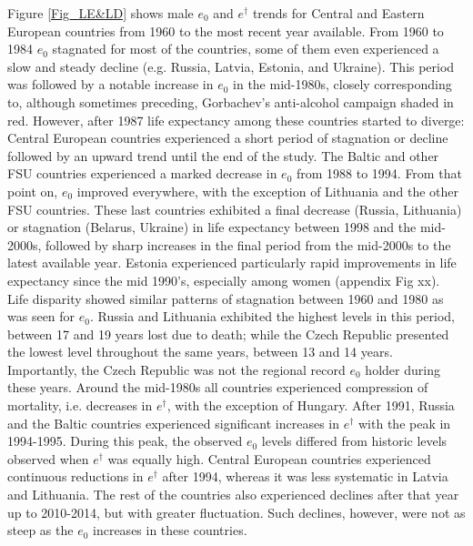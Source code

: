 \documentclass{article}
\begin{document}
\begin{spacing}{1.5}
Figure \ref{Fig_LE&LD} shows male $e_0$ and $e^{\dagger}$ trends for Central and Eastern European countries from 1960 to the most recent year available. From 1960 to 1984 $e_0$ stagnated for most of the countries, some of them even experienced a slow and steady decline (e.g. Russia, Latvia, Estonia, and Ukraine). This period was followed by a notable increase in $e_0$ in the mid-1980s, closely corresponding to, although sometimes preceding, Gorbachev's anti-alcohol campaign shaded in red. However, after 1987 life expectancy among these countries started to diverge: Central European countries experienced a short period of stagnation or decline followed by an upward trend until the end of the study. \textcolor[rgb]{1,0,0}{The Baltic and other FSU countries experienced a marked decrease in $e_0$ from 1988 to 1994. From that point on, $e_0$ improved everywhere, with the exception of Lithuania and the other FSU countries. These last countries exhibited a final decrease (Russia, Lithuania)} or stagnation (Belarus, Ukraine) in life expectancy between 1998 and the mid-2000s, followed by sharp increases in the final period from the mid-2000s to the latest available year. \textcolor[rgb]{1,0,0}{Estonia experienced particularly rapid improvements in life expectancy since the mid 1990's, especially among women (appendix Fig xx)}. \\

Life disparity showed similar patterns of stagnation between 1960 and 1980 as was seen for $e_0$. Russia and Lithuania exhibited the highest levels in this period, between 17 and 19 years lost due to death; while the Czech Republic presented the lowest level throughout the same years, between 13 and 14 years. Importantly, the Czech Republic was not the regional record $e_0$ holder during these years. Around the mid-1980s all countries experienced compression of mortality, i.e. decreases in $e^{\dagger}$, with the exception of Hungary. After 1991, Russia and \textcolor[rgb]{1,0,0}{the Baltic countries} experienced significant increases in $e^{\dagger}$ with the peak in 1994-1995. During this peak, the observed $e_0$ levels differed from historic levels observed when $e^{\dagger}$ was equally high. Central European countries experienced continuous reductions in $e^{\dagger}$ after 1994, whereas it was less systematic in Latvia and Lithuania. The rest of the countries also experienced declines after that year up to 2010-2014, but with greater fluctuation. Such declines, however, were not as steep as the $e_0$ increases in these countries.\\
 

\end{spacing}
\end{document}
